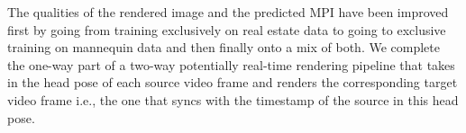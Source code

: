The qualities of the rendered image and the predicted MPI have been improved first by going from training exclusively on real estate data to going to exclusive training on mannequin data and then finally onto a mix of both. We complete the one-way part of a two-way potentially real-time rendering pipeline that takes in the head pose of each source video frame and renders the corresponding target video frame i.e., the one that syncs with the timestamp of the source in this head pose.


